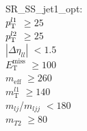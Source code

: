 SR\_SS\_jet1\_opt: \\
$p_{\text{T}}^{l1}$ $\geq 25$ \\
$p_{\text{T}}^{l2}$ $\geq 25$ \\
$|\Delta\eta_{ll}|$ $<1.5$ \\
$E_{\text{T}}^{\text{miss}}$ $\geq 100$ \\
$m_{\text{eff}}$ $\geq 260$ \\
$m_{\text{T}}^{l1}$ $\geq 140$ \\
$m_{lj}$/$m_{ljj}$ $<180$ \\
$m_{T2}$ $\geq 80$ \\
